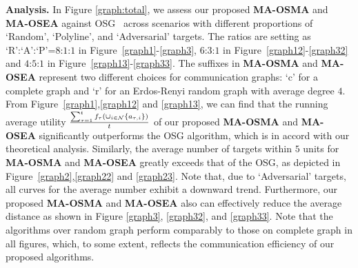 	\textbf{Analysis.} In Figure \ref{graph:total}, we assess our proposed \textbf{MA-OSMA} and \textbf{MA-OSEA} against  OSG~\citep{xu2023online} across scenarios with different proportions of `Random', `Polyline', and `Adversarial' targets. The ratios are setting as `R':`A':`P'=$8$:$1$:$1$ in Figure~\ref{graph1}-\ref{graph3}, $6$:$3$:$1$ in Figure~\ref{graph12}-\ref{graph32} and $4$:$5$:$1$ in Figure~\ref{graph13}-\ref{graph33}. The suffixes in \textbf{MA-OSMA} and \textbf{MA-OSEA} represent two different choices for communication graphs: `c' for a complete graph and `r' for an Erdos-Renyi random graph with average degree $4$. From  Figure~\ref{graph1},\ref{graph12} and \ref{graph13}, we can find that the running average utility $\frac{\sum_{\tau=1}^{t}f_{\tau}(\cup_{i\in\mathcal{N}}\{a_{\tau,i}\})}{t}$ of our proposed \textbf{MA-OSMA} and \textbf{MA-OSEA} significantly outperforms the OSG algorithm, which is in accord with our theoretical analysis. Similarly, the average number of targets within $5$ units for \textbf{MA-OSMA} and \textbf{MA-OSEA} greatly exceeds that of the OSG, as depicted in Figure~\ref{graph2},\ref{graph22} and \ref{graph23}. Note that, due to `Adversarial' targets, all curves for the average number exhibit a downward trend. Furthermore, our proposed \textbf{MA-OSMA} and \textbf{MA-OSEA} also can effectively reduce the average distance as shown in Figure \ref{graph3}, \ref{graph32}, and \ref{graph33}. 
 Note that the algorithms over random graph  perform comparably to those on complete graph in all figures, which, to some extent, reflects the communication efficiency of our proposed algorithms.
